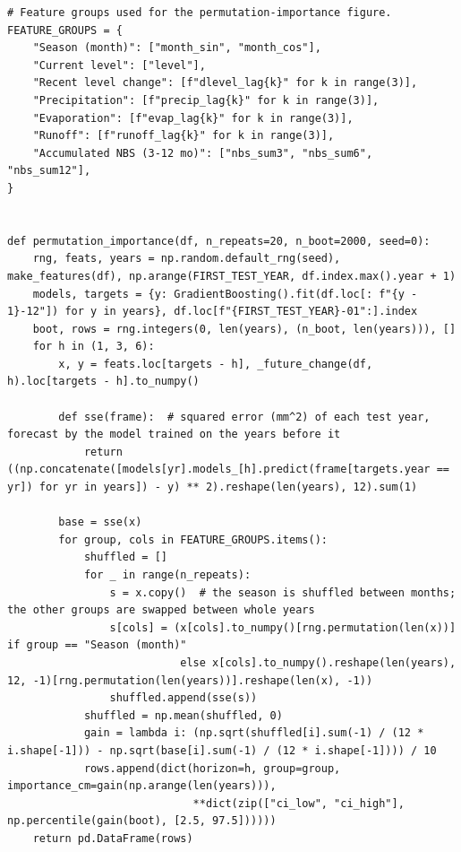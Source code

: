 \documentclass{article}
\begin{document}
\begin{lstlisting}[caption={Permutation importance}]
# Feature groups used for the permutation-importance figure.
FEATURE_GROUPS = {
    "Season (month)": ["month_sin", "month_cos"],
    "Current level": ["level"],
    "Recent level change": [f"dlevel_lag{k}" for k in range(3)],
    "Precipitation": [f"precip_lag{k}" for k in range(3)],
    "Evaporation": [f"evap_lag{k}" for k in range(3)],
    "Runoff": [f"runoff_lag{k}" for k in range(3)],
    "Accumulated NBS (3-12 mo)": ["nbs_sum3", "nbs_sum6", "nbs_sum12"],
}


def permutation_importance(df, n_repeats=20, n_boot=2000, seed=0):
    rng, feats, years = np.random.default_rng(seed), make_features(df), np.arange(FIRST_TEST_YEAR, df.index.max().year + 1)
    models, targets = {y: GradientBoosting().fit(df.loc[: f"{y - 1}-12"]) for y in years}, df.loc[f"{FIRST_TEST_YEAR}-01":].index
    boot, rows = rng.integers(0, len(years), (n_boot, len(years))), []
    for h in (1, 3, 6):
        x, y = feats.loc[targets - h], _future_change(df, h).loc[targets - h].to_numpy()

        def sse(frame):  # squared error (mm^2) of each test year, forecast by the model trained on the years before it
            return ((np.concatenate([models[yr].models_[h].predict(frame[targets.year == yr]) for yr in years]) - y) ** 2).reshape(len(years), 12).sum(1)

        base = sse(x)
        for group, cols in FEATURE_GROUPS.items():
            shuffled = []
            for _ in range(n_repeats):
                s = x.copy()  # the season is shuffled between months; the other groups are swapped between whole years
                s[cols] = (x[cols].to_numpy()[rng.permutation(len(x))] if group == "Season (month)"
                           else x[cols].to_numpy().reshape(len(years), 12, -1)[rng.permutation(len(years))].reshape(len(x), -1))
                shuffled.append(sse(s))
            shuffled = np.mean(shuffled, 0)
            gain = lambda i: (np.sqrt(shuffled[i].sum(-1) / (12 * i.shape[-1])) - np.sqrt(base[i].sum(-1) / (12 * i.shape[-1]))) / 10
            rows.append(dict(horizon=h, group=group, importance_cm=gain(np.arange(len(years))),
                             **dict(zip(["ci_low", "ci_high"], np.percentile(gain(boot), [2.5, 97.5])))))
    return pd.DataFrame(rows)
\end{lstlisting}
\end{document}
